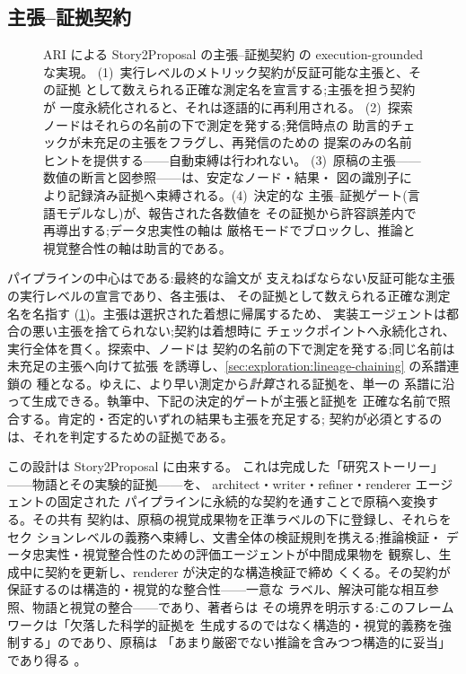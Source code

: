\subsection{主張--証拠契約}\label{sec:paper:contract}

\begin{figure}[t]
  \centering
  \resizebox{\columnwidth}{!}{}
  \caption{ARI による Story2Proposal の主張--証拠契約
           \cite{qian2026story2proposal} の execution-grounded な実現。
           (1)~実行レベルのメトリック契約が反証可能な主張と、その証拠
           として数えられる正確な測定名を宣言する;主張を担う契約が
           一度永続化されると、それは逐語的に再利用される。
           (2)~探索ノードはそれらの名前の下で測定を発する;発信時点の
           助言的チェックが未充足の主張をフラグし、再発信のための
           提案のみの名前ヒントを提供する——自動束縛は行われない。
           (3)~原稿の主張——数値の断言と図参照——は、安定なノード・結果・
           図の識別子により記録済み証拠へ束縛される。(4)~決定的な
           主張--証拠ゲート(言語モデルなし)が、報告された各数値を
           その証拠から許容誤差内で再導出する;データ忠実性の軸は
           厳格モードでブロックし、推論と視覚整合性の軸は助言的である。}
  \label{fig:claim-evidence}
\end{figure}

パイプラインの中心はである:最終的な論文が
支えねばならない反証可能な主張の実行レベルの宣言であり、各主張は、
その証拠として数えられる正確な測定名を名指す
(\cref{fig:claim-evidence})。主張は選択された着想に帰属するため、
実装エージェントは都合の悪い主張を捨てられない;契約は着想時に
チェックポイントへ永続化され、実行全体を貫く。探索中、ノードは
契約の名前の下で測定を発する;同じ名前は未充足の主張へ向けて拡張
を誘導し、\cref{sec:exploration:lineage-chaining} の系譜連鎖の
種となる。ゆえに、より早い測定から\emph{計算}される証拠を、単一の
系譜に沿って生成できる。執筆中、下記の決定的ゲートが主張と証拠を
正確な名前で照合する。肯定的・否定的いずれの結果も主張を充足する;
契約が必須とするのは、それを判定するための証拠である。

この設計は Story2Proposal \cite{qian2026story2proposal} に由来する。
これは完成した「研究ストーリー」——物語とその実験的証拠——を、
architect・writer・refiner・renderer エージェントの固定された
パイプラインに永続的な契約を通すことで原稿へ変換する。その共有
契約は、原稿の視覚成果物を正準ラベルの下に登録し、それらをセク
ションレベルの義務へ束縛し、文書全体の検証規則を携える;推論検証・
データ忠実性・視覚整合性のための評価エージェントが中間成果物を
観察し、生成中に契約を更新し、renderer が決定的な構造検証で締め
くくる。その契約が保証するのは構造的・視覚的な整合性——一意な
ラベル、解決可能な相互参照、物語と視覚の整合——であり、著者らは
その境界を明示する:このフレームワークは「欠落した科学的証拠を
生成するのではなく構造的・視覚的義務を強制する」のであり、原稿は
「あまり厳密でない推論を含みつつ構造的に妥当」であり得る
\cite{qian2026story2proposal}。

